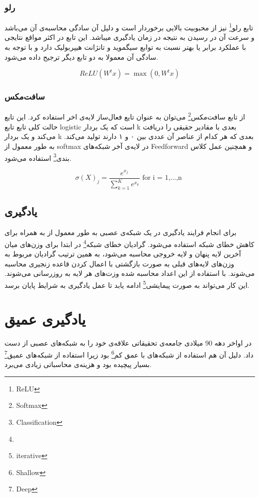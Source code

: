 \documentclass[12pt, a4paper, oneside]{report}
\begin{document}
\subsubsection{رلو}

تابع
رلو\footnote{ReLU}
نیز از محبوبیت بالایی برخوردار است و دلیل آن سادگی محاسبه‌ی آن می‌باشد و سرعت آن در رسیدن به نتیجه در زمان
یادگیری میباشد. این تابع در اکثر مواقع نتایجی با عملکرد برابر یا بهتر نسبت به توابع
سیگموید و تانژانت هیپربولیک
دارد و با توجه به سادگی آن معمولا به دو تابع دیگر ترجیح داده می‌شود.

\begin{equation}
    ReLU(W^tx) = \max(0, W^tx)
\label{formula:relu}
\end{equation}

\subsubsection{سافت‌مکس}

از تابع
سافت‌مکس\footnote{Softmax}
می‌توان به عنوان
تایع فعال‌ساز
لایه‌ی اخر استفاده کرد. این تابع حالت کلی تابع تابع
logistic
است که یک بردار
k
بعدی با مقادیر حقیقی را دریافت می‌کند و یک بردار
k
بعدی که هر کدام از عناصر آن عددی بین ۰ و ۱ دارند تولید می‌کند. به طور معمول از
softmax
در لایه‌ی آخر شبکه‌های
Feedforward
و همچنین عمل
کلاس بندی\footnote{Classification}
استفاده می‌شود.

\begin{equation}
   \sigma(X)_j = \dfrac{e^{x_j}}{\sum_{k = 1}^{K} e^{x_k} }  \mbox{ for i = 1,...,n }
\label{formula:softmax}
\end{equation}

\subsection{یادگیری}

برای انجام فرایند یادگیری در یک شبکه‌ی عصبی به طور معمول از
به همراه
برای کاهش خطای شبکه استفاده می‌شود. گرادیان
خطای شبکه\footnote{}
در ابتدا برای وزن‌های میان آخرین لایه پنهان و لایه خروجی محاسبه می‌شود، به همین ترتیب گرادیان
مربوط به وزن‌های لایه‌های قبلی به صورت بازگشتی با اعمال کردن قاعده زنجیری محاسبه می‌شوند.
با استفاده از این اعداد محاسبه شده وزت‌های هر لایه به روزرسانی می‌شوند. این کار می‌تواند به صورت
پیمایشی\footnote{iterative}
ادامه یابد تا عمل یادگیری به شرایط پایان برسد.

\section{یادگیری عمیق}
در اواخر دهه 90 میلادی جامعه‌ی تحقیقاتی علاقه‌ی خود را به شبکه‌های عصبی از دست داد. دلیل آن هم استفاده از شبکه‌های
با عمق کم\footnote{Shallow}
بود زیرا استفاده از شبکه‌های عمیق\footnote{Deep}
بسیار پیچیده بود و هزینه‌ی محاسباتی زیادی می‌برد.
\end{document}
